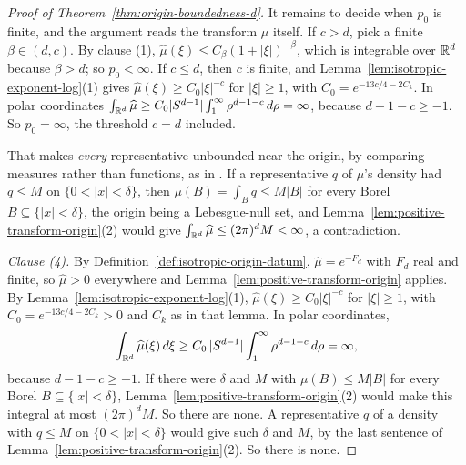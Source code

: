 \begin{proof}[Proof of Theorem~\ref{thm:origin-boundedness-d}]
It remains to decide when $p_0$ is finite, and the argument reads the transform $\widehat\mu$
itself. If $c > d$, pick a finite $\beta \in (d,c)$. By clause (1),
$\widehat\mu(\xi) \le C_\beta(1+|\xi|)^{-\beta}$, which is integrable over $\mathbb{R}^d$ because
$\beta > d$; so $p_0 < \infty$. If $c \le d$, then $c$ is finite, and
Lemma~\ref{lem:isotropic-exponent-log}(1) gives $\widehat\mu(\xi) \ge C_0|\xi|^{-c}$ for $|\xi| \ge 1$,
with $C_0 = e^{-13c/4 - 2C_k}$. In polar coordinates
$\int_{\mathbb{R}^d}\widehat\mu \ge C_0|S^{d-1}|\int_1^\infty\rho^{d-1-c}\,d\rho = \infty$, because
$d - 1 - c \ge -1$. So $p_0 = \infty$, the threshold $c = d$ included.

That makes \emph{every} representative unbounded near the origin, by comparing measures rather than
functions, as in . If a representative $q$ of $\mu$'s density had $q \le M$ on
$\{0 < |x| < \delta\}$, then $\mu(B) = \int_B q \le M|B|$ for every Borel
$B \subseteq \{|x| < \delta\}$, the origin being a Lebesgue-null set, and
Lemma~\ref{lem:positive-transform-origin}(2) would give $\int_{\mathbb{R}^d}\widehat\mu \le (2\pi)^dM < \infty$,
a contradiction.

\emph{Clause (4).} By Definition~\ref{def:isotropic-origin-datum}, $\widehat\mu = e^{-F_d}$ with $F_d$ real
and finite, so $\widehat\mu > 0$ everywhere and Lemma~\ref{lem:positive-transform-origin} applies. By
Lemma~\ref{lem:isotropic-exponent-log}(1), $\widehat\mu(\xi) \ge C_0|\xi|^{-c}$ for $|\xi| \ge 1$, with
$C_0 = e^{-13c/4 - 2C_k} > 0$ and $C_k$ as in that lemma. In polar coordinates,
\[
  \int_{\mathbb{R}^d}\widehat\mu(\xi)\,d\xi \ge C_0\,|S^{d-1}|\int_1^\infty \rho^{d-1-c}\,d\rho = \infty ,
\]
because $d - 1 - c \ge -1$. If there were $\delta$ and $M$ with $\mu(B) \le M|B|$ for every Borel
$B \subseteq \{|x| < \delta\}$, Lemma~\ref{lem:positive-transform-origin}(2) would make this integral at
most $(2\pi)^dM$. So there are none. A representative $q$ of a density with $q \le M$ on
$\{0 < |x| < \delta\}$ would give such $\delta$ and $M$, by the last sentence of
Lemma~\ref{lem:positive-transform-origin}(2). So there is none.


\end{proof}
